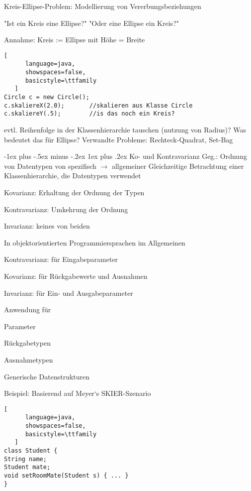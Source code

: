 \documentclass[10pt]{article}
\makeatletter
\renewcommand{\subsubsection}{\@startsection{subsubsection}{3}{0mm}%
                                {-1ex plus -.5ex minus -.2ex}%
                                {1ex plus .2ex}%
                                {\normalfont\small\bfseries}}
\makeatother
\begin{document}
\begin{itemize*}
Kreis-Ellipse-Problem: Modellierung von Vererbungsbeziehungen
\begin{itemize*}
  \item "Ist ein Kreis eine Ellipse?" "Oder eine Ellipse ein Kreis?"
  \item Annahme: Kreis := Ellipse mit Höhe = Breite
\end{itemize*}
\begin{lstlisting}[
      language=java,
      showspaces=false,
      basicstyle=\ttfamily
   ]
Circle c = new Circle();  
c.skaliereX(2.0);       //skalieren aus Klasse Circle
c.skaliereY(.5);        //is das noch ein Kreis?
\end{lstlisting}

evtl. Reihenfolge in der Klassenhierarchie tauschen (nutzung von Radius)? Was bedeutet das für Ellipse?
Verwandte Probleme: Rechteck-Quadrat, Set-Bag

\subsubsection{Ko- und Kontravarianz}
Geg.: Ordnung von Datentypen von spezifisch $\rightarrow$ allgemeiner
Gleichzeitige Betrachtung einer Klassenhierarchie, die Datentypen verwendet
\begin{itemize*}
  \item Kovarianz: Erhaltung der Ordnung der Typen
  \item Kontravarianz: Umkehrung der Ordnung
  \item Invarianz: keines von beiden
\end{itemize*}
In objektorientierten Programmiersprachen im Allgemeinen
\begin{itemize*}
  \item Kontravarianz: für Eingabeparameter
  \item Kovarianz: für Rückgabewerte und Ausnahmen
  \item Invarianz: für Ein- und Ausgabeparameter
\end{itemize*}
Anwendung für
\begin{itemize*}
  \item Parameter
  \item Rückgabetypen
  \item Ausnahmetypen
  \item Generische Datenstrukturen
\end{itemize*}

Beispiel: Basierend auf Meyer‘s SKIER-Szenario
\begin{lstlisting}[
      language=java,
      showspaces=false,
      basicstyle=\ttfamily
   ]
class Student {
String name;
Student mate;
void setRoomMate(Student s) { ... }
}
\end{lstlisting}


\end{itemize*}
\end{document}
